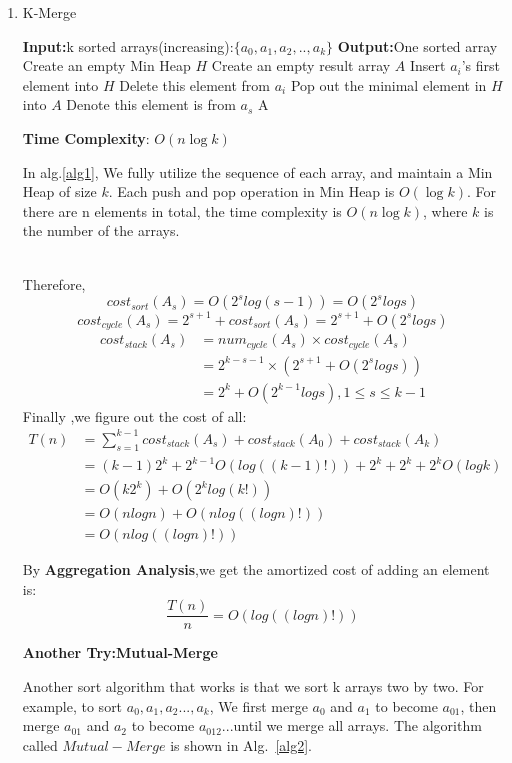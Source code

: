 \documentclass[12pt,a4paper]{article}
\makeatletter
\newtheorem*{solution}{Solution}
\theoremstyle{definition}
\renewenvironment{solution}[1][Solution] {\par\pushQED{\qed}\normalfont\topsep6\p@\@plus6\p@\relax\trivlist\item[\hskip\labelsep\bfseries#1\@addpunct{.}]\ignorespaces}{\popQED\endtrivlist\@endpefalse} \makeatother
\makeatother
\begin{document}
\begin{enumerate}
\begin{enumerate}
\begin{solution}
 \begin{algorithm}[H]
   \caption{K-Merge}\label{alg1}
   \textbf{Input:}k sorted arrays(increasing):$\{a_0,a_1,a_2,..,a_k \}$\;
   \textbf{Output:}One sorted array\;
	Create an empty Min Heap $H$\;
	Create an empty result array $A$\;
	{
	    Insert $a_i$'s first element into $H$\;
	    Delete this element from $a_i$\;
	}
	{
	    Pop out the minimal element in $H$ into $A$\;
	    Denote this element is from $a_s$\;
	}
	\Return A
		
	\end{algorithm}
	
\textbf{Time Complexity}: $O(n\log k)$

In alg.\ref{alg1}, We fully utilize the sequence of each array, and maintain a Min Heap of size $k$. Each push and pop operation in Min Heap is $O(\log k)$. For there are n elements in total, the time complexity is $O(n\log k)$, where $k$ is the number of the arrays.

~\\
Therefore, 
$$
cost_{sort}(A_s)=O(2^slog(s-1))=O(2^slogs)
$$
$$
cost_{cycle}(A_s)=2^{s+1} + cost_{sort}(A_s)=2^{s+1} + O(2^slogs)
$$
$$
\begin{aligned}
cost_{stack}(A_s)&=num_{cycle}(A_s)\times cost_{cycle}(A_s)\\
&=2^{k-s-1}\times (2^{s+1} + O(2^slogs))\\
&=2^k + O(2^{k-1}logs), 1\leq s\leq k-1
\end{aligned}
$$
Finally ,we figure out the cost of all:
$$
\begin{aligned}
T(n) &= \sum_{s=1}^{k-1}cost_{stack}(A_s) + cost_{stack}(A_0) + cost_{stack}(A_k)\\
&= (k-1)2^k + 2^{k-1}O(log((k-1)!)) + 2^k + 2^k +2^kO(logk)\\
&=O(k2^k) + O(2^klog(k!))\\
&=O(nlogn) + O(nlog((logn)!))\\
&=O(nlog((logn)!))
\end{aligned}
$$

By \textbf{Aggregation Analysis},we get the amortized cost of adding an element is:
        $$
        \frac{T(n)}{n} = O(log((logn)!))
        $$
        
\textbf{Another Try:Mutual-Merge}

Another sort algorithm that works is that we sort k arrays two by two. For example, to sort $a_0, a_1, a_2...,a_k$, We first merge $a_0$ and $a_1$ to become $a_01$, then merge $a_01$ and $a_2$ to become $a_012$...until we merge all arrays. The algorithm called $Mutual-Merge$ is shown in Alg.~\ref{alg2}.


\end{solution}
\end{enumerate}
\end{enumerate}
\end{document}
